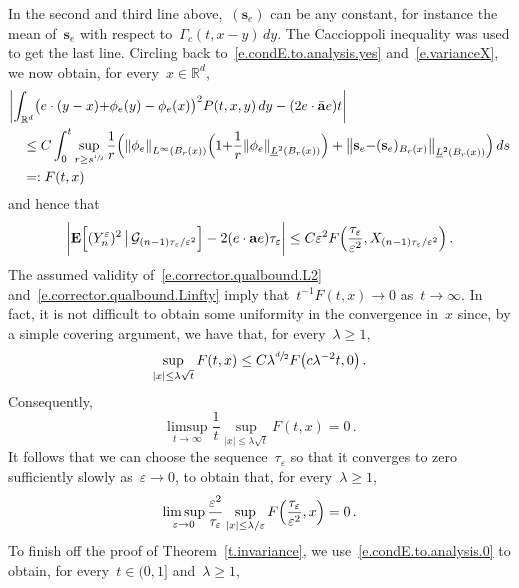 \documentclass[11pt]{article} %
\numberwithin{equation}{section}
\theoremstyle{definition}
\let\originalleft\left
\let\originalright\right
\renewcommand{\left}{\mathopen{}\mathclose\bgroup\originalleft}
\renewcommand{\right}{\aftergroup\egroup\originalright}
\newcommand*{\Rd}{\ensuremath{\mathbb{R}^d}}
\newcommand{\eps}{\varepsilon}
\newcommand{\ep}{\eps}
\renewcommand{\a}{\mathbf{a}}
\newcommand{\ahom}{\bar{\a}}
\begin{document}
In the second and third line above,~$(\mathbf{s}_e)$ can be any constant, for instance the mean of~$\mathbf{s}_e$ with respect to~$\Gamma_c(t,x-y)\,dy$. 
The Caccioppoli inequality was used to get the last line.
Circling back to~\eqref{e.condE.to.analysis.yes} and~\eqref{e.varianceX}, we now obtain, for every~$x \in \Rd$,
\begin{align}
\label{e.varianceX.est}
\lefteqn{
\biggl| 
\int_{\Rd} 
\bigl(e \cdot (y-x) {+}\phi_{e}(y) - \phi_e(x) \bigr)^2 P(t,x,y)\,dy 
-
(2 e\cdot \ahom e) t
\biggr| 
} \quad & 
\notag \\ &
\leq
C\int_0^{t}   
\sup_{r \geq {s}^{\sfrac12}} 
\frac1{r} 
\Bigl( 
\left\| \phi_e \right\|_{L^\infty(B_{r}(x))}
\Bigl( 1 {+} 
\frac1{r} 
\left\| \phi_e \right\|_{\underline{L}^2(B_{r}(x))}
\Bigr) 
+ \left\| \mathbf{s}_e {-} (\mathbf{s}_e)_{B_r(x)} \right\|_{\underline{L}^2(B_{r}(x))}
\Bigr)
\, ds 
\notag \\ & 
= : F(t,x)
\end{align}
and hence that
\begin{equation}
\label{e.condE.to.analysis.0}
\biggl| 
\mathbf{E} \Bigl[ (Y_{n}^\ep )^2 \, \big\vert \, \mathcal{G}_{(n-1)\tau_\ep/\ep^2} \Bigr] 
- 2 (e\cdot \a e) \tau_\ep
\biggr|
\leq
C\ep^2 F\Bigl( \frac{\tau_\ep} {\ep^2} , X_{(n-1)\tau_\ep/\ep^2}\Bigr)
\,.
\end{equation}
The assumed validity of~\eqref{e.corrector.qualbound.L2} and~\eqref{e.corrector.qualbound.Linfty} imply that~$t^{-1} F(t,x) \to 0$ as~$t\to \infty$. In fact, it is not difficult to obtain some uniformity in the convergence in~$x$ since, by a simple covering argument, we have that, for every~$\lambda\geq 1$, 
\begin{equation*}
\sup_{|x| \leq \lambda \sqrt{t} } F(t,x) 
\leq 
C\lambda^{\sfrac d2} F\bigl( c\lambda^{-2}t,0 \bigr)
\,.
\end{equation*}
Consequently,
\begin{equation*}
\limsup_{ t \to \infty}
\frac 1t 
\sup_{|x| \leq \lambda \sqrt{t} }
F (t, x)
= 0
\,.
\end{equation*}
It follows that we can choose the sequence~$\tau_\ep$ so that it converges to zero sufficiently slowly as~$\ep \to 0$, to obtain that, for every~$\lambda\geq 1$, 
\begin{equation}
\label{e.F.uniform.trap.tauep}
\limsup_{ \ep \to 0}
\frac{\ep^2}{\tau_\ep}
\sup_{ |x| \leq \lambda/\ep}
F \Bigl( \frac {\tau_\ep}{\ep^2}, x \Bigr)
= 0
\,.
\end{equation}
To finish off the proof of Theorem~\ref{t.invariance}, we use~\eqref{e.condE.to.analysis.0} to obtain, for every~$t \in (0,1]$ and~$\lambda\geq 1$,
\end{document}
